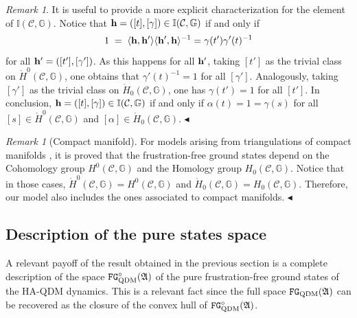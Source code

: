 \documentclass[a4paper,12pt,twoside,reqno]{amsart}
\theoremstyle{plain}
\theoremstyle{definition}
\theoremstyle{remark}
\newtheorem{remark}[teo]{Remark}
\numberwithin{equation}{section}
\numberwithin{figure}{section}
\numberwithin{table}{section}
\newcommand{\f}[1]{\mathcal{#1}}
\newcommand{\n}[1]{\mathbb{#1}}
\begin{document}
	
	\begin{remark}
		It is useful to provide a more explicit characterization for the element of  $\n{I}(\f{C},\n{G})$.
		Notice that  ${\bf h} =([t],[\gamma]) \in \n{I}(\f{C},\n{G})$
		if and only if 
		\begin{equation*}
			1\;=\;\langle {\bf h} ,{\bf h}'\rangle\langle {\bf h}' ,{\bf h}\rangle^{-1}=\gamma(t')\gamma'(t)^{-1}
		\end{equation*}
		for all ${\bf h'} =([t'],[\gamma'])$.
		As this happens for all ${\bf h'}$, taking $[t']$ as the trivial class on $\mathring{H}^0(\f{C},\n{G})$, one obtains that $\gamma'(t)^{-1}=1$ for all $[\gamma']$. Analogously, taking $[\gamma']$ as the trivial class on $\mathring{H}_0(\f{C},\n{G})$, one has $\gamma(t')=1$ for all $[t']$.
		In conclusion, ${\bf h} =([t],[\gamma]) \in \n{I}(\f{C},\n{G})$
		if and only if  $\alpha(t)=1=\gamma(s)$
		for all $[s]\in \mathring{H}^0(\f{C},\n{G})$ and $[\alpha]\in \mathring{H}_0(\f{C},\n{G})$.
		\hfill $\blacktriangleleft$
	\end{remark}
	
	
	
	
	
	\medskip
	
	
	
	
	\begin{remark}[Compact manifold]
		For models arising from triangulations of compact manifolds \cite{Lorca2025, dealmeida2017topological}, it is proved that the frustration-free ground states depend on the Cohomology group $H^0(\f{C},\n{G})$ and the Homology group $H_0(\f{C},\n{G})$. 
		Notice that in those cases, $\mathring{H}^0(\f{C},\n{G}) = H^0(\f{C},\n{G})$ and $\mathring{H}_0(\f{C},\n{G}) = H_0(\f{C},\n{G})$. Therefore, our model also includes the ones associated to compact manifolds.
		\hfill $\blacktriangleleft$
	\end{remark}
	
	
	
	
	\subsection{Description of the pure states space}
	A relevant payoff of the result obtained in the previous section is a complete description of the space  $\mathtt{FG}_{\rm QDM}^{\circ}(\mathfrak{A})$ of the pure frustration-free ground states of the HA-QDM dynamics. This is a relevant fact since the full space $\mathtt{FG}_{\rm QDM}(\mathfrak{A})$ can be recovered as the closure of the convex hull of $\mathtt{FG}_{\rm QDM}^{\circ}(\mathfrak{A})$.
	
\end{document}
